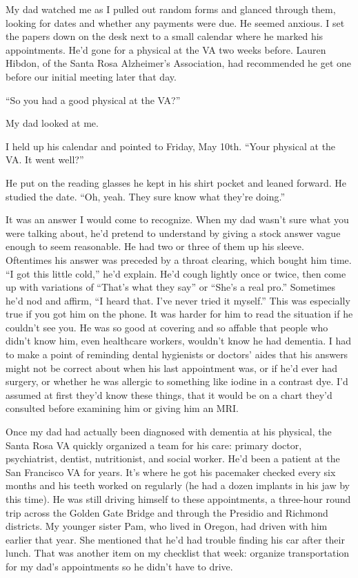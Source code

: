 \documentclass[12pt]{book}
\begin{document}
My dad watched me as I pulled out random forms and glanced through them, looking for dates and whether any payments were due. He seemed anxious. I set the papers down on the desk next to a small calendar where he marked his appointments. He'd gone for a physical at the VA two weeks before. Lauren Hibdon, of the Santa Rosa Alzheimer's Association, had recommended he get one before our initial meeting later that day.

``So you had a good physical at the VA?''

My dad looked at me.

I held up his calendar and pointed to Friday, May 10th. ``Your physical at the VA. It went well?''

He put on the reading glasses he kept in his shirt pocket and leaned forward. He studied the date. ``Oh, yeah. They sure know what they're doing.''

It was an answer I would come to recognize. When my dad wasn't sure what you were talking about, he'd pretend to understand by giving a stock answer vague enough to seem reasonable. He had two or three of them up his sleeve. Oftentimes his answer was preceded by a throat clearing, which bought him time. ``I got this little cold,'' he'd explain. He'd cough lightly once or twice, then come up with variations of ``That's what they say'' or ``She's a real pro.'' Sometimes he'd nod and affirm, ``I heard that. I've never tried it myself.'' This was especially true if you got him on the phone. It was harder for him to read the situation if he couldn't see you. He was so good at covering and so affable that people who didn't know him, even healthcare workers, wouldn't know he had dementia. I had to make a point of reminding dental hygienists or doctors' aides that his answers might not be correct about when his last appointment was, or if he'd ever had surgery, or whether he was allergic to something like iodine in a contrast dye. I'd assumed at first they'd know these things, that it would be on a chart they'd consulted before examining him or giving him an MRI.

Once my dad had actually been diagnosed with dementia at his physical, the Santa Rosa VA quickly organized a team for his care: primary doctor, psychiatrist, dentist, nutritionist, and social worker. He'd been a patient at the San Francisco VA for years. It's where he got his pacemaker checked every six months and his teeth worked on regularly (he had a dozen implants in his jaw by this time). He was still driving himself to these appointments, a three-hour round trip across the Golden Gate Bridge and through the Presidio and Richmond districts. My younger sister Pam, who lived in Oregon, had driven with him earlier that year. She mentioned that he'd had trouble finding his car after their lunch. That was another item on my checklist that week: organize transportation for my dad's appointments so he didn't have to drive.
\end{document}
